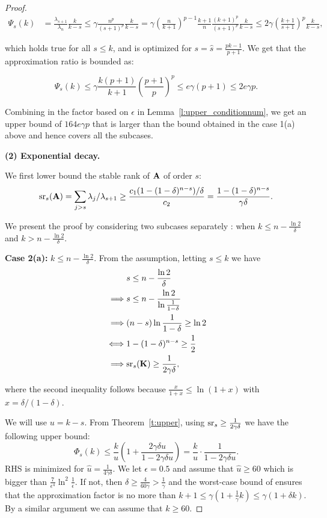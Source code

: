 \documentclass{article}
\begin{document}
\begin{proof}
  \begin{align*}
    \Psi_s(k) &= \frac{\lambda_{s+1}}{\lambda_n}\frac{k}{k-s}\leq
      \gamma\frac{n^p}{(s+1)^p}\frac{k}{k-s} =\gamma
      \left(\frac{n}{k+1}\right)^{p-1}
      \frac{k+1}{n}\frac{{(k+1)^p}}{{(s+1)^p}} \frac{k}{k-s}
    \leq 2\gamma\left(\frac{k+1}{s+1}\right)^p \frac{k}{k-s},
  \end{align*}
  
  which holds true for all $s \leq k$, and is optimized for $s=
  \hat{s}=\frac{pk-1}{p+1}$. We get that the approximation
  ratio is bounded as: 
  
  \[\Psi_s(k) \leq
    \gamma\frac{k(p+1)}{k+1}\left(\frac{p+1}{p}\right)^p \leq
    e\gamma(p+1)\leq 2e\gamma p. \] 
  
  Combining in the factor based on $\epsilon$ in
  Lemma~\ref{l:upper_conditionnum}, we get an upper bound of
  $164e\gamma p$ that is larger than the bound obtained in the case
  1(a) above and hence covers all the subcases. 
  
\textbf{  (2) Exponential decay.}
  
  
We  first lower bound the stable rank of $\mathbf A$ of order $s$:
  \[ {\mathrm{sr}}_s(\mathbf A) = \sum_{j>s} \lambda_j/\lambda_{s+1} \geq
    \frac{c_1(1-(1-\delta)^{n-s})/\delta }{c_2} =
    \frac{1-(1-\delta)^{n-s}}{\gamma\delta}. 
  \]
  
  We present the proof by considering two subcases separately : when
  $k\leq n-  \frac{\ln 2}{\delta}$ and $k>n-  \frac{\ln 2}{\delta}$. 
  
  \textbf{Case 2(a):}  $k\leq n-  \frac{\ln 2}{\delta}$. From the
  assumption, letting $s\leq k$  we have
  \begin{align*}
& s \leq n - \frac{\ln 2}{\delta}  \\
    \implies  & s \leq n - \frac{\ln 2}{\ln \frac{1}{1-\delta}} \\
    \implies  & (n-s)\ln \frac{1}{1-\delta} \geq \ln 2\\
    \iff & 1 - (1-\delta)^{n-s} \geq \frac{1}{2}   \\
    \implies & {\mathrm{sr}}_s(\mathbf K) \geq \frac{1}{2\gamma \delta},
  \end{align*}
  
  where the second inequality follows because $\frac{x}{1+x} \leq \ln (1+x)$ with $x = \delta/(1-\delta)$.  
  
  We will use $u=k-s$. From Theorem~\ref{t:upper}, using ${\mathrm{sr}}_s \geq
  \frac{1}{2\gamma\delta}$ we have the following upper bound:   
  \[ \Phi_s(k) \leq \frac{k}{u} \left(1+ \frac{2\gamma\delta u}{1 -
        2\gamma\delta u}\right)  = \frac{k}{u}\cdot
    \frac{1}{1-2\gamma\delta u}.\]
  RHS is minimized for $\hat{u}=\frac{1}{4\gamma\delta}$. We let
  $\epsilon=0.5$ and assume that
  $\hat{u}\geq 60$ which is bigger than $\frac{7}{\epsilon^4} \ln^2 \frac{1}{\epsilon}$.
If not, then $\delta\geq\frac4{60\gamma}>\frac1\gamma$ and
the  worst-case bound of \citet{pca-volume-sampling} ensures that the
approximation factor is no more than $k+1 \leq \gamma(1+\frac1\gamma
k)\leq \gamma(1+\delta k)$. By a similar argument we can assume that
$k\geq 60$.
  

\end{proof}
\end{document}

